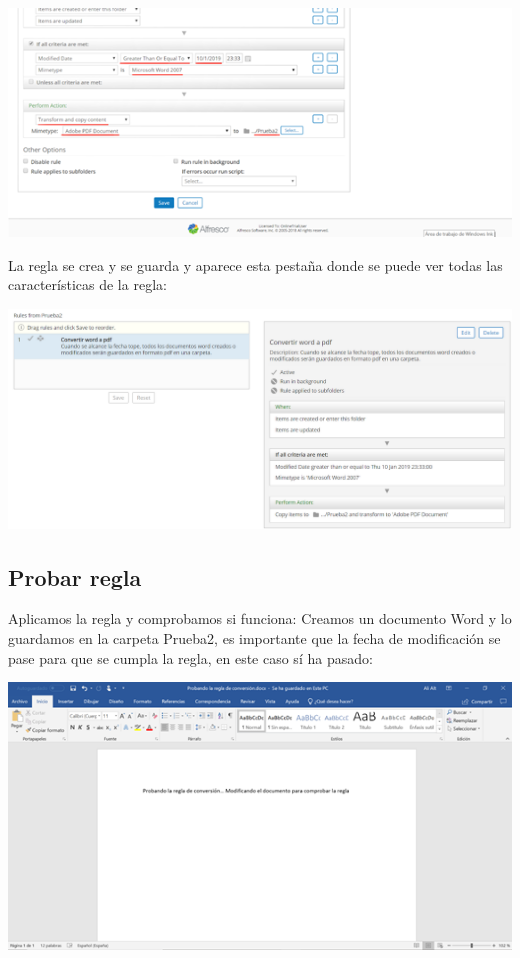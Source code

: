 \documentclass{article}
\begin{document}
\begin{center}
\includegraphics[scale=0.8]{images/regla4.png}
\end{center}

La regla se crea y se guarda y aparece esta pestaña donde se puede ver todas las características de la regla: 

\begin{center}
\includegraphics[scale=0.25]{images/regla5.PNG}
\end{center}

\subsection{Probar regla}

Aplicamos la regla y comprobamos si funciona:
Creamos un documento Word y lo guardamos en la carpeta Prueba2, es importante que la fecha de modificación se pase para que se cumpla la regla, en este caso sí ha pasado:

\begin{center}
\includegraphics[scale=0.7]{images/word.png}
\end{center}
\end{document}
